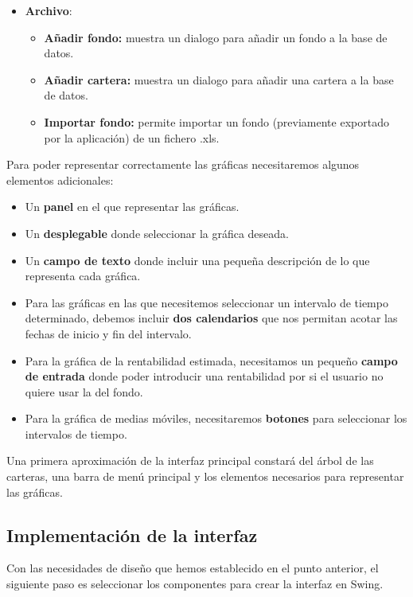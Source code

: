 \documentclass[12pt, a4paper]{book}
\begin{document}
\begin{itemize}
	\item \textbf{Archivo}:
	\begin{itemize}
		\item\textbf{Añadir fondo:} muestra un dialogo para añadir un fondo a la base de datos.
		\item \textbf{Añadir cartera:} muestra un dialogo para añadir una cartera a la base de datos.
		\item \textbf{Importar fondo:} permite importar un fondo (previamente exportado por la aplicación) de un fichero .xls.\\
	\end{itemize}
\end{itemize}

Para poder representar correctamente las gráficas necesitaremos algunos elementos adicionales: 
\begin{itemize}
	\item Un \textbf{panel} en el que representar las gráficas.
	\item Un \textbf{desplegable} donde seleccionar la gráfica deseada.
	\item Un \textbf{campo de texto} donde incluir una pequeña descripción de lo que representa cada gráfica.
	\item Para las gráficas en las que necesitemos seleccionar un intervalo de tiempo determinado, debemos incluir \textbf{dos calendarios} que nos permitan acotar las fechas de inicio y fin del intervalo.
	\item Para la gráfica de la rentabilidad estimada, necesitamos un pequeño \textbf{campo de entrada} donde poder introducir una rentabilidad por si el usuario no quiere usar la del fondo.
	\item Para la gráfica de medias móviles, necesitaremos \textbf{botones} para seleccionar los intervalos de tiempo.
\end{itemize}


Una primera aproximación de la interfaz principal constará del árbol de las carteras, una barra de menú principal y los elementos necesarios para representar las gráficas.

\newpage

\subsection{Implementación de la interfaz}

Con las necesidades de diseño que hemos establecido en el punto anterior, el siguiente paso es seleccionar los componentes para crear la interfaz en Swing.
\\
\end{document}
